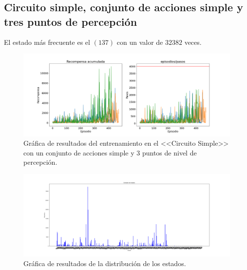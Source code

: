 \newpage
\subsection{Circuito simple, conjunto de acciones simple y tres puntos de percepción}

El estado más frecuente es el  $(137)$ con un valor de $32382$ veces.

\begin{figure}[!ht]
    \centering \includegraphics[width=1\columnwidth]{./figures/anexos/simple_circuit_simple_3.png}
    \caption{Gráfica de resultados del entrenamiento en el <<Circuito Simple>> con un conjunto de acciones simple y 3 puntos de nivel de percepción.}
\end{figure}

\begin{figure}[!ht]
    \centering \includegraphics[width=1\columnwidth]{./figures/anexos/states_counter_simple_circuit_simple_3.png}
    \caption{Gráfica de resultados de la distribución de los estados.}
\end{figure}

